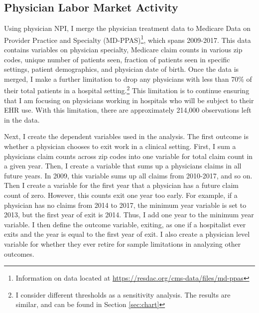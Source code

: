 \documentclass[12pt]{article}
\begin{document}
\subsection{Physician Labor Market Activity}\label{sec:appmdppas}

Using physician NPI, I merge the physician treatment data to Medicare Data on Provider Practice and Specialty (MD-PPAS)\footnote{Information on data located at \hyperlink{https://resdac.org/cms-data/files/md-ppas}{https://resdac.org/cms-data/files/md-ppas}}, which spans 2009-2017. This data contains variables on physician specialty, Medicare claim counts in various zip codes, unique number of patients seen, fraction of patients seen in specific settings, patient demographics, and physician date of birth. Once the data is merged, I make a further limitation to drop any physicians with less than 70\% of their total patients in a hospital setting.\footnote{I consider different thresholds as a sensitivity analysis. The results are similar, and can be found in Section \ref{sec:chart}} This limitation is to continue ensuring that I am focusing on physicians working in hospitals who will be subject to their EHR use. With this limitation, there are approximately 214,000 observations left in the data. 

Next, I create the dependent variables used in the analysis. The first outcome is whether a physician chooses to exit work in a clinical setting. First, I sum a physicians claim counts across zip codes into one variable for total claim count in a given year. Then, I create a variable that sums up a physicians claims in all future years. In 2009, this variable sums up all claims from 2010-2017, and so on. Then I create a variable for the first year that a physician has a future claim count of zero. However, this counts exit one year too early. For example, if a physician has no claims from 2014 to 2017, the minimum year variable is set to 2013, but the first year of exit is 2014. Thus, I add one year to the minimum year variable. I then define the outcome variable, exiting, as one if a hospitalist ever exits and the year is equal to the first year of exit. I also create a physician level variable for whether they ever retire for sample limitations in analyzing other outcomes. 
\end{document}
